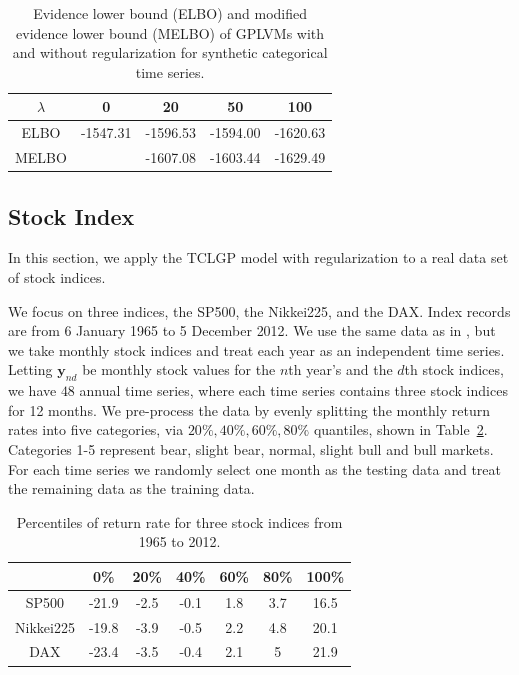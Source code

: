 \documentclass{article}
\begin{document}
\begin{table}[ht!]
	\centering
	\begin{tabular}{|c|c|c|c|c|}
		\hline
		$\lambda$ & 0 & 20 & 50 & 100 \\
		\hline
		ELBO & -1547.31  & -1596.53 & -1594.00 & -1620.63 \\
		\hline
		MELBO &  & -1607.08 & -1603.44 & -1629.49 \\
		\hline
	\end{tabular}
	\caption{Evidence lower bound (ELBO) and modified evidence lower bound (MELBO) of GPLVMs with and without regularization for synthetic categorical time series.}
	\label{tab:SIM}
\end{table}

\subsection{Stock Index}
In this section, we apply the TCLGP model with regularization to a real data set of stock indices.

We focus on three indices, the SP500, the Nikkei225, and the DAX. Index records are from 6 January 1965 to 5 December 2012. We use the same data as in \cite{Joao_2014}, but we take monthly stock indices and treat each year as an independent time series. Letting $\bm y_{nd}$ be monthly stock values for the $n$th year's and the $d$th stock indices, we have $48$ annual time series, where each time series contains three stock indices for 12 months. We pre-process the data by evenly splitting the monthly return rates into five categories, via $20\%, 40\%, 60\%, 80\%$ quantiles, shown in Table~\ref{quan}. Categories 1-5 represent bear, slight bear, normal, slight bull and bull markets. For each time series we randomly select one month as the testing data and treat the remaining data as the training data.

\begin{table}[ht!]
	\centering
	\begin{tabular}{|c|c|c|c|c|c|c|}
		\hline
		& 0\% & 20\% & 40\% & 60\% & 80\% & 100\% \\
		\hline
		SP500 & -21.9 & -2.5 & -0.1 & 1.8 & 3.7 & 16.5 \\
		\hline
		Nikkei225 & -19.8 & -3.9 & -0.5 & 2.2 & 4.8 & 20.1 \\
		\hline
		DAX & -23.4 & -3.5 & -0.4 & 2.1 & 5 & 21.9 \\
		\hline
	\end{tabular}
    \caption{Percentiles of return rate for three stock indices from 1965 to 2012.}
	\label{quan}
\end{table}
\end{document}

